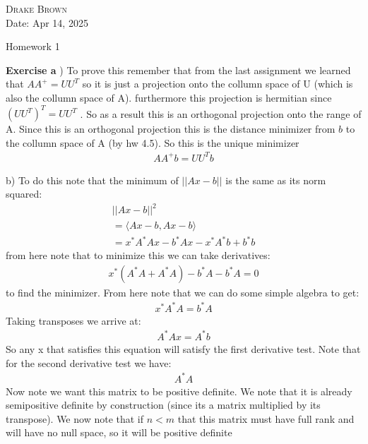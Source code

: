 \documentclass[12pt]{article}
\newenvironment{exercise}[1]{\vspace{.1in}\noindent\textbf{Exercise #1 \hspace{.05em}}}{}
\theoremstyle{definition}
\theoremstyle{remark}
\begin{document}
\begin{flushright}
	\textsc{Drake Brown}  \\
	Date: Apr 14, 2025
\end{flushright}
\begin{center}
	Homework 1
\end{center}

\begin{exercise}{6.1}

	a) To prove this remember that from the last assignment we learned that $AA^+=UU^T$ so it is just a projection onto the collumn space of U (which is also the collumn space of A). furthermore this projection is hermitian since $(UU^T)^T=UU^T$ . So as a result this is an orthogonal projection onto the range of A. Since this is an orthogonal projection this is the distance minimizer from $b$ to the collumn space of A (by hw 4.5). So this is the unique minimizer
	\begin{align}
		AA^+b=UU^Tb
	\end{align}

	b) To do this note that the minimum of $||Ax-b||$ is the same as its norm squared:
	\begin{align}
		||Ax-b||^2                 \\
		=\langle Ax-b, Ax-b\rangle \\
		=x^*A^*Ax-b^*Ax-x^*A^*b+b^*b
	\end{align}
	from here note that to minimize this we can take derivatives:
	\begin{align}
		x^*(A^*A+A^*A)-b^*A-b^*A=0
	\end{align}
	to find the minimizer. From here note that we can do some simple algebra to get:
	\begin{align}
		x^*A^*A=b^*A
	\end{align}
	Taking transposes we arrive at:
	\begin{align}
		A^*Ax=A^*b
	\end{align}
	So any x that satisfies this equation will satisfy the first derivative test. Note that for the second derivative test we have:
	\begin{align}
		A^*A
	\end{align}
	Now note we want this matrix to be positive definite. We note that it is already semipositive definite by construction (since its a matrix multiplied by its transpose). We now note that if $n<m$ that this matrix must have full rank and will have no null space, so it will be positive definite


\end{exercise}
\end{document}
